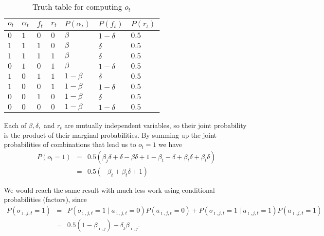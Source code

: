 \documentclass{amsart}
\theoremstyle{plain}
\numberwithin{equation}{section}
\begin{document}
\begin{table}[tbp] \centering%
\begin{tabular}{|l|l|l|l|l|l|l|}
\hline
$o_{t}$ & $\alpha _{t}$ & $f_{t}$ & $r_{t}$ & $P\left( \alpha _{t}\right) $
& $P\left( f_{t}\right) $ & $P\left( r_{t}\right) $ \\ \hline
$0$ & $1$ & $0$ & $0$ & $\beta $ & $1-\delta $ & $0.5$ \\ \hline
$1$ & $1$ & $1$ & $0$ & $\beta $ & $\delta $ & $0.5$ \\ \hline
$1$ & $1$ & $1$ & $1$ & $\beta $ & $\delta $ & $0.5$ \\ \hline
$0$ & $1$ & $0$ & $1$ & $\beta $ & $1-\delta $ & $0.5$ \\ \hline
$1$ & $0$ & $1$ & $1$ & $1-\beta $ & $\delta $ & $0.5$ \\ \hline
$1$ & $0$ & $0$ & $1$ & $1-\beta $ & $1-\delta $ & $0.5$ \\ \hline
$0$ & $0$ & $1$ & $0$ & $1-\beta $ & $\delta $ & $0.5$ \\ \hline
$0$ & $0$ & $0$ & $0$ & $1-\beta $ & $1-\delta $ & $0.5$ \\ \hline
\end{tabular}%
\caption{Truth table for computing $o_t$}\label{TableKey}%
\end{table}%

Each of $\beta ,\delta ,$ and $r_{t}$ are mutually independent variables, so
their joint probability is the product of their marginal probabilities. By
summing up the joint probabilities of combinations that lead us to $o_{t}=1$
we have%
\begin{eqnarray*}
P(o_{t}=1) &=&0.5(\beta _{j}\delta +\delta -\beta \delta +1-\beta
_{t}-\delta +\beta _{t}\delta +\beta _{t}\delta ) \\
&=&0.5(-\beta _{t}+\beta _{t}\delta +1)
\end{eqnarray*}

We would reach the same result with much less work using conditional
probabilities (factors), since%
\begin{eqnarray*}
P(o_{\bar{\imath},j,t}=1) &=&P(o_{\bar{\imath},j,t}=1\mid a_{\bar{\imath}%
,j,t}=0)P(a_{\bar{\imath},j,t}=0)+P(o_{\bar{\imath},j,t}=1\mid a_{\bar{\imath%
},j,t}=1)P(a_{\bar{\imath},j,t}=1) \\
&=&0.5(1-\beta _{\bar{\imath},j})+\delta _{j}\beta _{\bar{\imath},j}.
\end{eqnarray*}
\end{document}
